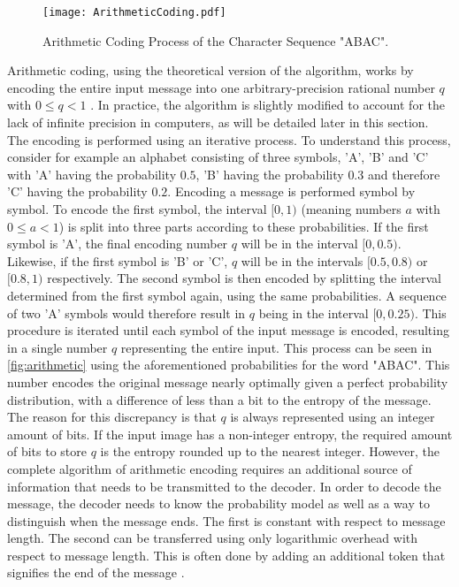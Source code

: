 \begin{figure}
\centering
\texttt{[image: ArithmeticCoding.pdf]}
\caption{Arithmetic Coding Process of the Character Sequence "ABAC".}
\label{fig:arithmetic}
\end{figure}

Arithmetic coding, using the theoretical version of the algorithm, works by encoding the entire input message into one arbitrary-precision rational number $q$ with $0 \leq q < 1$ \citep{said_introduction_2023}. In practice, the algorithm is slightly modified to account for the lack of infinite precision in computers, as will be detailed later in this section. The encoding is performed using an iterative process. To understand this process, consider for example an alphabet consisting of three symbols, 'A', 'B' and 'C' with 'A' having the probability $0.5$, 'B' having the probability $0.3$ and therefore 'C' having the probability $0.2$. Encoding a message is performed symbol by symbol. To encode the first symbol, the interval $[0,1)$ (meaning numbers $a$ with $0 \leq a < 1$) is split into three parts according to these probabilities. If the first symbol is 'A', the final encoding number $q$ will be in the interval $[0,0.5)$. Likewise, if the first symbol is 'B' or 'C', $q$ will be in the intervals $[0.5,0.8)$ or $[0.8,1)$ respectively. The second symbol is then encoded by splitting the interval determined from the first symbol again, using the same probabilities. A sequence of two 'A' symbols would therefore result in $q$ being in the interval $[0,0.25)$. This procedure is iterated until each symbol of the input message is encoded, resulting in a single number $q$ representing the entire input. This process can be seen in \autoref{fig:arithmetic} using the aforementioned probabilities for the word "ABAC". This number encodes the original message nearly optimally given a perfect probability distribution, with a difference of less than a bit to the entropy of the message. The reason for this discrepancy is that $q$ is always represented using an integer amount of bits. If the input image has a non-integer entropy, the required amount of bits to store $q$ is the entropy rounded up to the nearest integer. However, the complete algorithm of arithmetic encoding requires an additional source of information that needs to be transmitted to the decoder. In order to decode the message, the decoder needs to know the probability model as well as a way to distinguish when the message ends. The first is constant with respect to message length. The second can be transferred using only logarithmic overhead with respect to message length. This is often done by adding an additional token that signifies the end of the message \citep{said_introduction_2023}.

